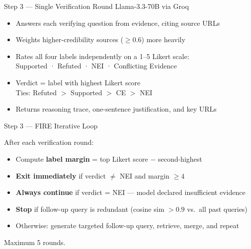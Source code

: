 \documentclass[11pt, aspectratio=169]{beamer}
\begin{document}
\begin{frame}{Step 3 — Single Verification Round \hfill \normalsize\textcolor{slate}{Llama-3.3-70B via Groq}}

  \begin{itemize}\setlength{\itemsep}{14pt}
    \item Answers each verifying question from evidence, citing source URLs
    \item Weights higher-credibility sources ($\geq 0.6$) more heavily
    \item Rates \alert{all four labels independently} on a 1--5 Likert scale:\\
          Supported · Refuted · NEI · Conflicting Evidence
    \item Verdict = label with highest Likert score\\
          Ties: Refuted $>$ Supported $>$ CE $>$ NEI
    \item Returns reasoning trace, one-sentence justification, and key URLs
  \end{itemize}
\end{frame}

\begin{frame}{Step 3 — FIRE Iterative Loop}

  After each verification round:

  \bigskip
  \begin{itemize}\setlength{\itemsep}{14pt}
    \item Compute \textbf{label margin} = top Likert score $-$ second-highest
    \item \textbf{Exit immediately} if verdict $\neq$ NEI and margin $\geq 4$
    \item \textbf{Always continue} if verdict = NEI — model declared insufficient evidence
    \item \textbf{Stop} if follow-up query is redundant (cosine sim $> 0.9$ vs.\ all past queries)
    \item Otherwise: generate targeted follow-up query, retrieve, merge, and repeat
  \end{itemize}

  \bigskip
  {\small\textcolor{slate}{Maximum 5 rounds.}}
\end{frame}
\end{document}
